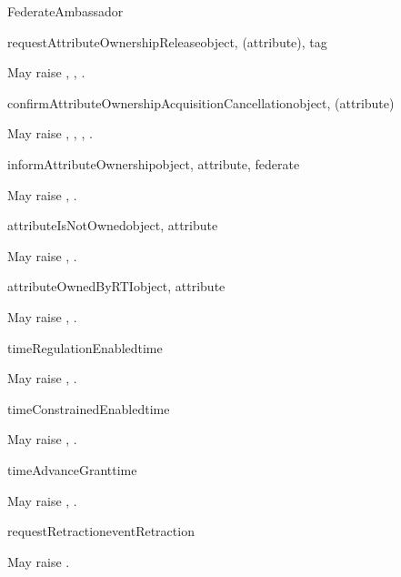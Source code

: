 \begin{classdesc}{FederateAmbassador}{}
\begin{methoddesc}{requestAttributeOwnershipRelease}{object, (attribute), tag}

May raise
,
,
.
\end{methoddesc}

\begin{methoddesc}{confirmAttributeOwnershipAcquisitionCancellation}{object, (attribute)}

May raise
,
,
,
.
\end{methoddesc}

\begin{methoddesc}{informAttributeOwnership}{object, attribute, federate}

May raise
,
.
\end{methoddesc}

\begin{methoddesc}{attributeIsNotOwned}{object, attribute}

May raise
,
.
\end{methoddesc}

\begin{methoddesc}{attributeOwnedByRTI}{object, attribute}

May raise
,
.
\end{methoddesc}

\medskip
{}

\begin{methoddesc}{timeRegulationEnabled}{time}

May raise
,
.
\end{methoddesc}

\begin{methoddesc}{timeConstrainedEnabled}{time}

May raise
,
.
\end{methoddesc}

\begin{methoddesc}{timeAdvanceGrant}{time}

May raise
,
.
\end{methoddesc}

\begin{methoddesc}{requestRetraction}{eventRetraction}

May raise
.
\end{methoddesc}

\end{classdesc}

